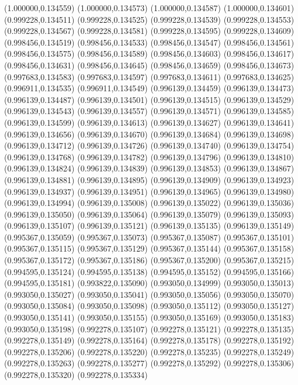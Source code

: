 (1.000000,0.134559)
(1.000000,0.134573)
(1.000000,0.134587)
(1.000000,0.134601)
(0.999228,0.134511)
(0.999228,0.134525)
(0.999228,0.134539)
(0.999228,0.134553)
(0.999228,0.134567)
(0.999228,0.134581)
(0.999228,0.134595)
(0.999228,0.134609)
(0.998456,0.134519)
(0.998456,0.134533)
(0.998456,0.134547)
(0.998456,0.134561)
(0.998456,0.134575)
(0.998456,0.134589)
(0.998456,0.134603)
(0.998456,0.134617)
(0.998456,0.134631)
(0.998456,0.134645)
(0.998456,0.134659)
(0.998456,0.134673)
(0.997683,0.134583)
(0.997683,0.134597)
(0.997683,0.134611)
(0.997683,0.134625)
(0.996911,0.134535)
(0.996911,0.134549)
(0.996139,0.134459)
(0.996139,0.134473)
(0.996139,0.134487)
(0.996139,0.134501)
(0.996139,0.134515)
(0.996139,0.134529)
(0.996139,0.134543)
(0.996139,0.134557)
(0.996139,0.134571)
(0.996139,0.134585)
(0.996139,0.134599)
(0.996139,0.134613)
(0.996139,0.134627)
(0.996139,0.134641)
(0.996139,0.134656)
(0.996139,0.134670)
(0.996139,0.134684)
(0.996139,0.134698)
(0.996139,0.134712)
(0.996139,0.134726)
(0.996139,0.134740)
(0.996139,0.134754)
(0.996139,0.134768)
(0.996139,0.134782)
(0.996139,0.134796)
(0.996139,0.134810)
(0.996139,0.134824)
(0.996139,0.134839)
(0.996139,0.134853)
(0.996139,0.134867)
(0.996139,0.134881)
(0.996139,0.134895)
(0.996139,0.134909)
(0.996139,0.134923)
(0.996139,0.134937)
(0.996139,0.134951)
(0.996139,0.134965)
(0.996139,0.134980)
(0.996139,0.134994)
(0.996139,0.135008)
(0.996139,0.135022)
(0.996139,0.135036)
(0.996139,0.135050)
(0.996139,0.135064)
(0.996139,0.135079)
(0.996139,0.135093)
(0.996139,0.135107)
(0.996139,0.135121)
(0.996139,0.135135)
(0.996139,0.135149)
(0.995367,0.135059)
(0.995367,0.135073)
(0.995367,0.135087)
(0.995367,0.135101)
(0.995367,0.135115)
(0.995367,0.135129)
(0.995367,0.135144)
(0.995367,0.135158)
(0.995367,0.135172)
(0.995367,0.135186)
(0.995367,0.135200)
(0.995367,0.135215)
(0.994595,0.135124)
(0.994595,0.135138)
(0.994595,0.135152)
(0.994595,0.135166)
(0.994595,0.135181)
(0.993822,0.135090)
(0.993050,0.134999)
(0.993050,0.135013)
(0.993050,0.135027)
(0.993050,0.135041)
(0.993050,0.135056)
(0.993050,0.135070)
(0.993050,0.135084)
(0.993050,0.135098)
(0.993050,0.135112)
(0.993050,0.135127)
(0.993050,0.135141)
(0.993050,0.135155)
(0.993050,0.135169)
(0.993050,0.135183)
(0.993050,0.135198)
(0.992278,0.135107)
(0.992278,0.135121)
(0.992278,0.135135)
(0.992278,0.135149)
(0.992278,0.135164)
(0.992278,0.135178)
(0.992278,0.135192)
(0.992278,0.135206)
(0.992278,0.135220)
(0.992278,0.135235)
(0.992278,0.135249)
(0.992278,0.135263)
(0.992278,0.135277)
(0.992278,0.135292)
(0.992278,0.135306)
(0.992278,0.135320)
(0.992278,0.135334)
